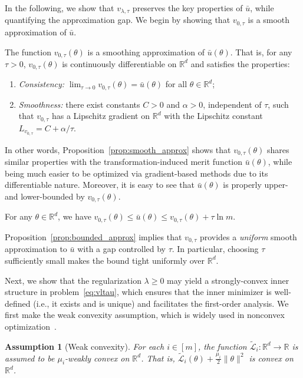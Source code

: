 \documentclass[sigconf]{acmart}
\newtheorem{assumption}{Assumption}
\begin{document}

In the following, we show that $v_{\lambda,\tau}$ preserves the key properties of $\bar{u}$, while quantifying the approximation gap. We begin by showing that $v_{0,\tau}$ is a smooth approximation of $\bar{u}$.
\begin{proposition}
\label{prop:smooth_approx}
The function $v_{0, \tau}(\theta)$ is a smoothing approximation of $\bar{u}(\theta)$. That is, for any $\tau>0$, $v_{0, \tau}(\theta)$ is continuously differentiable on
$\mathbb{R}^d$ and satisfies the properties:
\begin{enumerate}
    \item \emph{Consistency:}\;
    $\lim_{\tau\to 0} v_{0,\tau}(\theta)=\bar{u}(\theta)$ for all $\theta\in \mathbb{R}^d$;
    \item \emph{Smoothness:}\;
    there exist constants $C>0$ and $\alpha>0$, independent of $\tau$, such that
    $v_{0,\tau}$ has a Lipschitz gradient on $\mathbb{R}^d$ with the Lipschitz constant
    $L_{v_{0,\tau}} = C + \alpha/\tau$.
\end{enumerate}
\end{proposition}

\noindent
In other words, Proposition~\ref{prop:smooth_approx} shows that $v_{0, \tau}(\theta)$ shares similar properties with the transformation-induced merit function $\bar{u}(\theta)$, while being much easier to be optimized via gradient-based methods due to its differentiable nature. Moreover, it is easy to see that $\bar{u}(\theta)$ is properly upper- and lower-bounded by $v_{0,\tau}(\theta)$.
\begin{proposition}
\label{prop:bounded_approx}
For any $\theta\in \mathbb{R}^d$, we have $v_{0,\tau}(\theta) \le \bar{u}(\theta)\leq v_{0,\tau}(\theta) + \tau\ln m $.
\end{proposition}
Proposition~\ref{prop:bounded_approx} implies that $v_{0,\tau}$ provides a \emph{uniform} smooth approximation to $\bar{u}$ with a gap controlled by $\tau$. In particular, choosing $\tau$ sufficiently small makes the bound tight uniformly over $\mathbb{R}^d$.

Next, we show that the regularization $\lambda\geq 0$ may yield a strongly-convex inner structure in problem~\eqref{eq:vltau}, which ensures that the inner minimizer is well-defined (i.e., it exists and is unique) and facilitates the first-order analysis. We first make the weak convexity assumption, which is widely used in nonconvex optimization~\cite{lin2020gradient,xu2023unified,chen2025efficient}.
\begin{assumption}[Weak convexity]
\label{ass:weak_convexity}
For each $i\in[m]$, the function $\tilde{\mathcal{L}}_i:\mathbb{R}^d \to\mathbb{R}$ is assumed to be $\mu_i$-weakly convex on $\mathbb{R}^d$.
That is, $\tilde{\mathcal{L}}_i(\theta)+\frac{\mu_i}{2}\|\theta\|^2$ is convex on $\mathbb{R}^d$.
\end{assumption}
\end{document}
